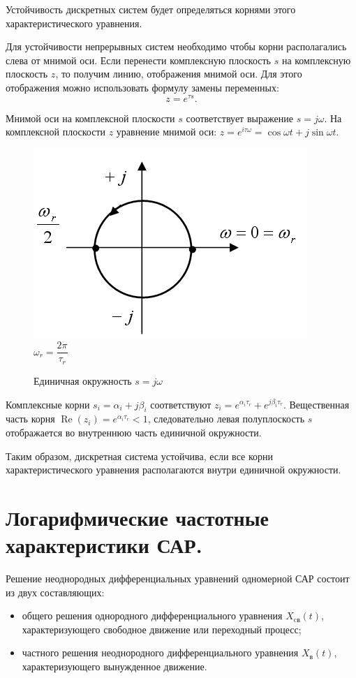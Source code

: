 \documentclass[unicode, 12pt, a4paper, oneside]{article}
\begin{document}
Устойчивость дискретных систем будет определяться корнями этого характеристического уравнения.

Для устойчивости непрерывных систем необходимо чтобы корни располагались слева от мнимой оси. Если перенести комплексную плоскость $ s $ на комплексную плоскость $ z $, то получим линию, отображения мнимой оси. Для этого отображения можно использовать формулу замены переменных:
\begin{equation}
z = e^{\tau s}.
\end{equation}

Мнимой оси на комплексной плоскости $ s $ соответствует выражение $ s = j\omega $. На комплексной плоскости $ z $ уравнение мнимой оси: $ z = e^{i\tau\omega} = \cos\omega t + j\sin\omega t $.

\begin{figure}[H]
\centering
\includegraphics[width=0.4\linewidth]{22_circ.png}
$ \omega_r = \dfrac{2\pi}{\tau_r} $
\caption{Единичная окружность $ s = j\omega $}
\end{figure}

Комплексные корни $ s_i = \alpha_i + j\beta_i $ соответствуют $ z_i = e^{\alpha_i\tau_r} + e^{j\beta_i\tau_r} $. Вещественная часть корня $ \operatorname{Re} (z_i) = e^{\alpha_i\tau_r} < 1 $, следовательно левая полуплоскость $ s $ отображается во внутреннюю часть единичной окружности.

Таким образом, дискретная система устойчива, если все корни характеристического уравнения располагаются внутри единичной окружности.

\section{Логарифмические частотные характеристики САР.}

Решение неоднородных дифференциальных уравнений одномерной САР состоит из двух составляющих:
\begin{itemize}
\item общего решения однородного дифференциального уравнения $ X_\text{cв}(t) $, характеризующего свободное движение или переходный процесс;
\item частного решения неоднородного дифференциального уравнения $ X_\text{в}(t) $, характеризующего вынужденное движение.
\end{itemize}
\end{document}
